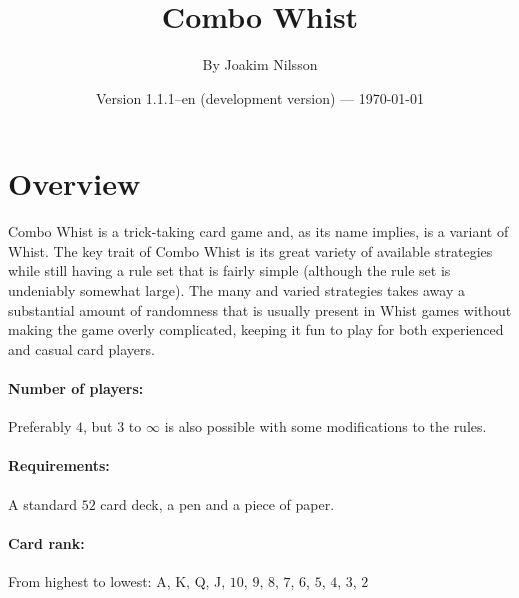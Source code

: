 \documentclass[a4paper]{article}
\title{Combo Whist}
\author{By Joakim Nilsson}
\date{Version 1.1.1--en (development version) --- \today}
\begin{document}
	\introPages

	\section{Overview}{%
		Combo Whist is a trick-taking card game and, as its name implies, is a variant of Whist. The key trait of Combo Whist is its great variety of available strategies while still having a rule set that is fairly simple (although the rule set is undeniably somewhat large). The many and varied strategies takes away a substantial amount of randomness that is usually present in Whist games without making the game overly complicated, keeping it fun to play for both experienced and casual card players.

		\paragraph{Number of players:}
		Preferably $4$, but $3$ to $\infty$ is also possible with some modifications to the rules.

		\paragraph{Requirements:}
		A standard $52$ card deck, a pen and a piece of paper.

		\paragraph{Card rank:}
		From highest to lowest: A, K, Q, J, $10$, $9$, $8$, $7$, $6$, $5$, $4$, $3$, $2$
	}
\end{document}
